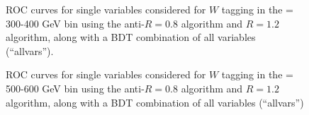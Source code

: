 \begin{figure}
\centering
{}
\caption{ROC curves for single variables considered for $W$
tagging in the \pT = 300-400 GeV bin using the anti-\kT $R=0.8$ algorithm and $R=1.2$ algorithm, along with a BDT combination of all variables (``allvars'').}
\label{fig:pt300_single}
\end{figure}


\begin{figure}
\centering
{}
\caption{ROC curves for single variables considered for $W$
tagging in the \pT = 500-600 GeV bin using the anti-\kT $R=0.8$ algorithm and $R=1.2$ algorithm, along with a BDT combination of all variables (``allvars'')}
\label{fig:pt500_single}
\end{figure}

